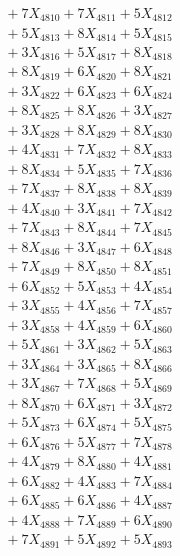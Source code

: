 \documentclass[a4paper,10pt]{article}
\begin{document}
{\begin{align}
&\;  + 7 X_{4810} + 7 X_{4811} + 5 X_{4812} \\[0.3ex]
&\;  + 5 X_{4813} + 8 X_{4814} + 5 X_{4815} \\[0.3ex]
&\;  + 3 X_{4816} + 5 X_{4817} + 8 X_{4818} \\[0.3ex]
&\;  + 8 X_{4819} + 6 X_{4820} + 8 X_{4821} \\[0.3ex]
&\;  + 3 X_{4822} + 6 X_{4823} + 6 X_{4824} \\[0.3ex]
&\;  + 8 X_{4825} + 8 X_{4826} + 3 X_{4827} \\[0.3ex]
&\;  + 3 X_{4828} + 8 X_{4829} + 8 X_{4830} \\[0.3ex]
&\;  + 4 X_{4831} + 7 X_{4832} + 8 X_{4833} \\[0.3ex]
&\;  + 8 X_{4834} + 5 X_{4835} + 7 X_{4836} \\[0.3ex]
&\;  + 7 X_{4837} + 8 X_{4838} + 8 X_{4839} \\[0.5ex]\allowbreak
&\;  + 4 X_{4840} + 3 X_{4841} + 7 X_{4842} \\[0.3ex]
&\;  + 7 X_{4843} + 8 X_{4844} + 7 X_{4845} \\[0.3ex]
&\;  + 8 X_{4846} + 3 X_{4847} + 6 X_{4848} \\[0.3ex]
&\;  + 7 X_{4849} + 8 X_{4850} + 8 X_{4851} \\[0.3ex]
&\;  + 6 X_{4852} + 5 X_{4853} + 4 X_{4854} \\[0.3ex]
&\;  + 3 X_{4855} + 4 X_{4856} + 7 X_{4857} \\[0.3ex]
&\;  + 3 X_{4858} + 4 X_{4859} + 6 X_{4860} \\[0.3ex]
&\;  + 5 X_{4861} + 3 X_{4862} + 5 X_{4863} \\[0.3ex]
&\;  + 3 X_{4864} + 3 X_{4865} + 8 X_{4866} \\[0.3ex]
&\;  + 3 X_{4867} + 7 X_{4868} + 5 X_{4869} \\[0.5ex]\allowbreak
&\;  + 8 X_{4870} + 6 X_{4871} + 3 X_{4872} \\[0.3ex]
&\;  + 5 X_{4873} + 6 X_{4874} + 5 X_{4875} \\[0.3ex]
&\;  + 6 X_{4876} + 5 X_{4877} + 7 X_{4878} \\[0.3ex]
&\;  + 4 X_{4879} + 8 X_{4880} + 4 X_{4881} \\[0.3ex]
&\;  + 6 X_{4882} + 4 X_{4883} + 7 X_{4884} \\[0.3ex]
&\;  + 6 X_{4885} + 6 X_{4886} + 4 X_{4887} \\[0.3ex]
&\;  + 4 X_{4888} + 7 X_{4889} + 6 X_{4890} \\[0.3ex]
&\;  + 7 X_{4891} + 5 X_{4892} + 5 X_{4893} \\[0.3ex]

\end{align}}
\end{document}
